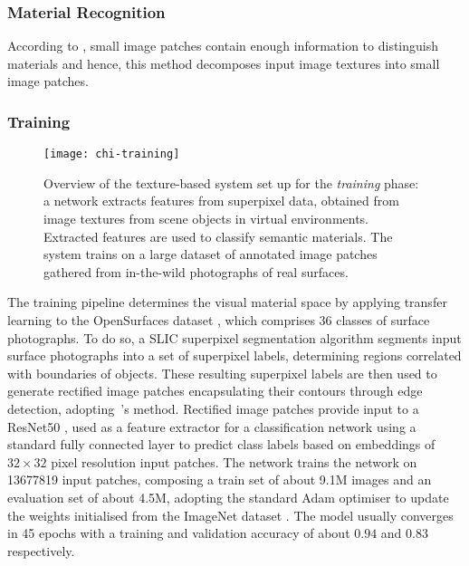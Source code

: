 \subsubsection{Material Recognition}
According to \cite{schwartz2019recognizing}, small image patches contain enough information to distinguish materials and hence, this method decomposes input image textures into small image patches.
\subsubsection{Training}
\begin{figure}[htbp]
    \centering
    \texttt{[image: chi-training]}
    \caption[Texture-based material recognition system --- training phase]{Overview of the texture-based system set up for the \emph{training} phase: a network extracts features from superpixel data, obtained from image textures from scene objects in virtual environments. Extracted features are used to classify semantic materials. The system trains on a large dataset of annotated image patches gathered from in-the-wild photographs of real surfaces.}
    \label{fig:texture-tagging-training}
\end{figure}
The training pipeline determines the visual material space by applying transfer learning to the OpenSurfaces dataset \citep{bell2013opensurfaces}, which comprises 36 classes of surface photographs. To do so, a SLIC superpixel segmentation algorithm \citep{slic6205760} segments input surface photographs into a set of superpixel labels, determining regions correlated with boundaries of objects. These resulting superpixel labels are then used to generate rectified image patches encapsulating their contours through edge detection, adopting~\cite{ding2001canny}'s method.
Rectified image patches provide input to a ResNet50 \citep{he2016deep}, used as a feature extractor for a classification network using a standard fully connected layer to predict class labels based on embeddings of $32\times32$ pixel resolution input patches. The network trains the network on \num{13677819} input patches, composing a train set of about 9.1M images and an evaluation set of about 4.5M, adopting the standard Adam optimiser \citep{kingma2014adam} to update the weights initialised from the ImageNet dataset \citep{deng2009imagenet}. The model usually converges in 45 epochs with a training and validation accuracy of about $0.94$ and $0.83$ respectively. 

